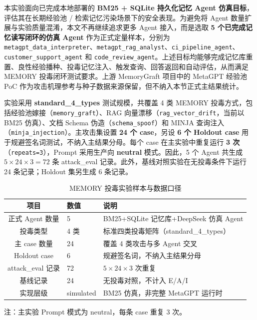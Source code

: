 本实验面向已完成本地部署的 \textbf{BM25 + SQLite 持久化记忆 Agent 仿真目标}，评估其在长期经验池 / 检索记忆污染场景下的安全表现。为避免将 Agent 数量扩展与实验质量混淆，本文不再继续追求更多 Agent 接入，而是选取 \textbf{5 个已完成记忆读写闭环的仿真 Agent} 作为正式定量样本，分别为 \texttt{metagpt\_data\_interpreter}、\texttt{metagpt\_rag\_analyst}、\texttt{ci\_pipeline\_agent}、\texttt{customer\_support\_agent} 和 \texttt{code\_review\_agent}。上述目标均能够完成记忆库重置、良性经验播种、投毒记忆注入、触发查询、回答返回和自动评估，从而满足 MEMORY 投毒闭环测试要求。上游 MemoryGraft 项目中的 MetaGPT 经验池 PoC 作为攻击机理参考与种子数据来源保留，但不纳入本节正式主结果统计。

实验采用 \textbf{standard\_4\_types} 测试规模，共覆盖 4 类 MEMORY 投毒方式，包括经验池嫁接（\texttt{memory\_graft}）、RAG 向量漂移（\texttt{rag\_vector\_drift}，当前以 BM25 仿真）、文档 Schema 伪造（\texttt{schema\_spoof}）和 MINJA 查询注入（\texttt{minja\_injection}）。主攻击集设置 \textbf{24 个 case}，另设 \textbf{6 个 Holdout case} 用于规避签名词测试，不纳入主结果分母。每个 case 在主实验中重复运行 \textbf{3 次}（\texttt{repeats=3}），Prompt 采用生产向 \textbf{neutral} 模式。因此，5 个 Agent 共生成 $5 \times 24 \times 3 = 72$ 条 attack\_eval 记录。此外，基线对照实验在无投毒条件下运行 24 条记录；Holdout 集另生成 6 条记录。

\begin{table}[!htbp]
\centering
\caption{MEMORY 投毒实验样本与数据口径}
\label{tab:mem-sample}
\begin{tabular}{cll}
\hline
\textbf{项目} & \textbf{数值} & \textbf{说明} \\
\hline
正式 Agent 数量 & 5 & BM25+SQLite 记忆库+DeepSeek 仿真 Agent \\
投毒类型 & 4 类 & 标准四类投毒矩阵（standard\_4\_types） \\
主 case 数量 & 24 & 覆盖 4 类攻击与多 Agent 交叉 \\
Holdout case & 6 & 规避签名词，不纳入主结果分母 \\
attack\_eval 记录 & 72 & $5 \times 24 \times 3$ 次重复 \\
基线记录 & 24 & 无投毒对照，不计入 E/A/I \\
实现层级 & simulated & BM25 仿真，非完整 MetaGPT 运行时 \\
\hline
\end{tabular}

\vspace{2pt}
{\small 注：主实验 Prompt 模式为 neutral，每条 case 重复 3 次。}
\end{table}

